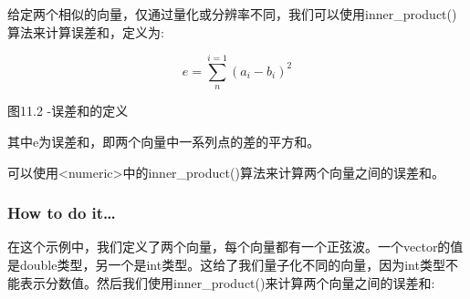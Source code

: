 
给定两个相似的向量，仅通过量化或分辨率不同，我们可以使用inner\_product()算法来计算误差和，定义为:

\begin{equation*}
e=\sum_{n}^{i=1}(a_i-b_i)^2
\end{equation*}

\begin{center}
图11.2 -误差和的定义
\end{center}

其中e为误差和，即两个向量中一系列点的差的平方和。

可以使用<numeric>中的inner\_product()算法来计算两个向量之间的误差和。

\subsubsection{How to do it…}

在这个示例中，我们定义了两个向量，每个向量都有一个正弦波。一个vector的值是double类型，另一个是int类型。这给了我们量子化不同的向量，因为int类型不能表示分数值。然后我们使用inner\_product()来计算两个向量之间的误差和:


